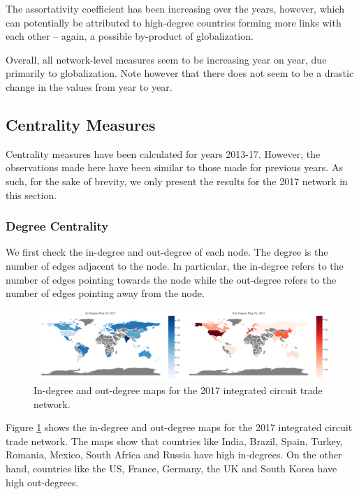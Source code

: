 \documentclass[12pt,letterpaper]{report}
\begin{document}
		The assortativity coefficient has been increasing over the years, however, which can potentially be attributed to high-degree countries forming more links with each other – again, a possible by-product of globalization. 
		
		Overall, all network-level measures seem to be increasing year on year, due primarily to globalization. Note however that there does not seem to be a drastic change in the values from year to year.
		
		\subsection{Centrality Measures}
		\label{ssec:522centrality}
		
			Centrality measures have been calculated for years 2013-17. 
			However, the observations made here have been similar to those made for previous years. As such, for the sake of brevity, we only present the results for the 2017 network in this section.
	
			\subsubsection{Degree Centrality}
			\label{ssec:5221degree}
			
			We first check the in-degree and out-degree of each node. The degree is the number of edges adjacent to the node. In particular, the in-degree refers to the number of edges pointing towards the node while the out-degree refers to the number of edges pointing away from the node.
			
			\begin{figure}[!h]
				\centering
				\includegraphics[width=\textwidth]{Fig505-DegreeMap.png}
				\caption{In-degree and out-degree maps for the 2017 integrated circuit trade network.}\label{fig:505DegreeMap}
			\end{figure}
			
			Figure \ref{fig:505DegreeMap} shows the in-degree and out-degree maps for the 2017 integrated circuit trade network. The maps show that countries like India, Brazil, Spain, Turkey, Romania, Mexico, South Africa and Russia have high in-degrees. On the other hand, countries like the US, France, Germany, the UK and South Korea have high out-degrees.
			
\end{document}
